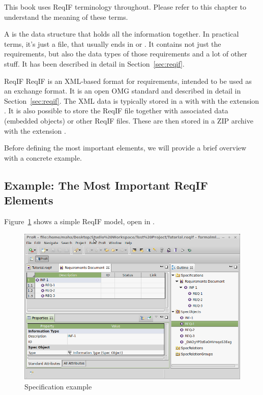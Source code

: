 \begin{info}
This book uses ReqIF terminology throughout.  Please refer to this chapter to understand the meaning of these terms.
\end{info}

A  is the data structure that holds all the information together.  In practical terms, it's just a file, that usually ends in  or .  It contains not just the requirements, but also the data types of those requirements and a lot of other stuff.  It has been described in detail in Section~\ref{sec:reqif}.

\begin{definition}{ReqIF}
ReqIF is an XML-based format for requirements, intended to be used as an exchange format.  It is an open OMG standard and described in detail in Section~\ref{sec:reqif}. The XML data is typically stored in a with with the extension .  It is also possible to store the ReqIF file together with associated data (embedded objects) or other ReqIF files.  These are then stored in a ZIP archive with the extension .
\end{definition}

Before defining the most important elements, we will provide a brief overview with a concrete example.

\subsection{Example: The Most Important ReqIF Elements}

Figure~\ref{fig:spec_example} shows a simple ReqIF model, open in \pror{}.  

\begin{figure}
  \centering
  \includegraphics[width=\textwidth]{../rmf-images/screenshot_INF_1.png}
  \caption{Specification example}
  \label{fig:spec_example}
\end{figure}

